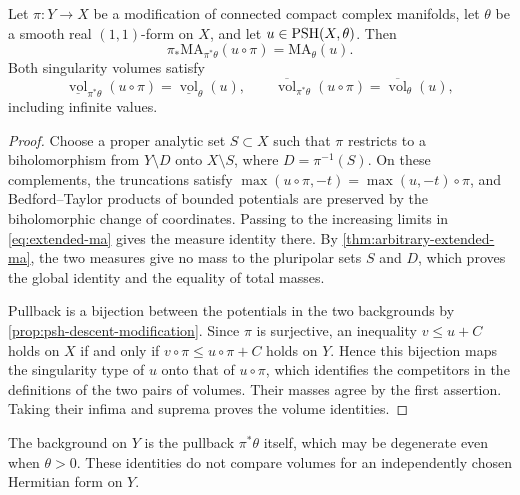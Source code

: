 \begin{proposition}\label{prop:singularity-volumes-modification}
Let $\pi\colon Y\to X$ be a modification of connected compact complex manifolds, let $\theta$ be a smooth real $(1,1)$-form on $X$, and let $u\in\mathrm{PSH}(X,\theta)$. Then
\[
 \pi_*\mathrm{MA}_{\pi^*\theta}(u\circ\pi)
       =\mathrm{MA}_\theta(u).
\]
Both singularity volumes satisfy
\[
 \underline{\operatorname{vol}}_{\pi^*\theta}(u\circ\pi)
       =\underline{\operatorname{vol}}_\theta(u),\qquad
 \overline{\operatorname{vol}}_{\pi^*\theta}(u\circ\pi)
       =\overline{\operatorname{vol}}_\theta(u),
\]
including infinite values.
\end{proposition}
\begin{proof}
Choose a proper analytic set $S\subset X$ such that $\pi$ restricts to a biholomorphism from $Y\setminus D$ onto $X\setminus S$, where $D=\pi^{-1}(S)$. On these complements, the truncations satisfy $\max(u\circ\pi,-t)=\max(u,-t)\circ\pi$, and Bedford--Taylor products of bounded potentials are preserved by the biholomorphic change of coordinates. Passing to the increasing limits in \eqref{eq:extended-ma} gives the measure identity there. By \cref{thm:arbitrary-extended-ma}, the two measures give no mass to the pluripolar sets $S$ and $D$, which proves the global identity and the equality of total masses.

Pullback is a bijection between the potentials in the two backgrounds by \cref{prop:psh-descent-modification}. Since $\pi$ is surjective, an inequality $v\leq u+C$ holds on $X$ if and only if $v\circ\pi\leq u\circ\pi+C$ holds on $Y$. Hence this bijection maps the singularity type of $u$ onto that of $u\circ\pi$, which identifies the competitors in the definitions of the two pairs of volumes. Their masses agree by the first assertion. Taking their infima and suprema proves the volume identities.
\end{proof}

The background on $Y$ is the pullback $\pi^*\theta$ itself, which may be degenerate even when $\theta>0$. These identities do not compare volumes for an independently chosen Hermitian form on $Y$.
